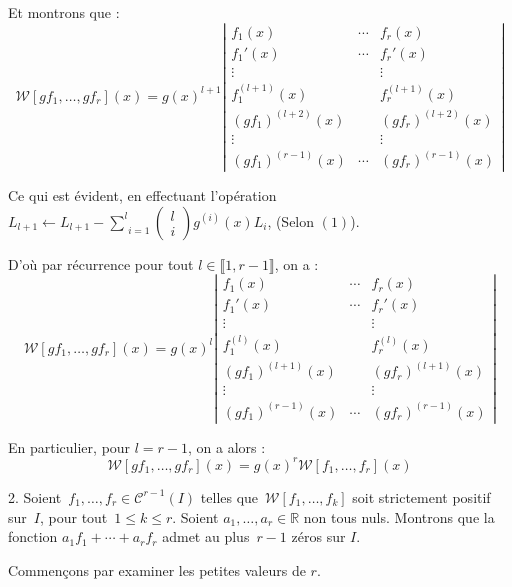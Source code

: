 Et montrons que :
\[ \mathcal{W} [gf_1, \ldots, gf_r] (x) = g (x)^{l + 1} \left|
   \begin{array}{ccc}
     f_1 (x) & \cdots & f_r (x)\\
     f_1' (x) & \cdots & f_r' (x)\\
     \vdots &  & \vdots\\
     f^{(l + 1)}_1 (x) &  & f^{(l + 1)}_r (x)\\
     (g f_1)^{(l + 2)} (x) &  & (g f_r)^{(l + 2)} (x)\\
     \vdots &  & \vdots\\
     (g f_1)^{(r - 1)} (x) & \cdots & (g f_r)^{(r - 1)} (x)
   \end{array} \right| \]

Ce qui est {\'e}vident, en effectuant l'op{\'e}ration $L_{l + 1} \leftarrow L_{l + 1} - \underset{i = 1}{\overset{l}{\sum}} \left( \begin{array}{c} l\\ i \end{array} \right) g^{(i)} (x) L_i$, (Selon $(1)$).

D'o{\`u} par r{\'e}currence pour tout $l \in \llbracket 1, r - 1 \rrbracket$,
on a :
\[ \mathcal{W} [gf_1, \ldots, gf_r] (x) = g (x)^l \left| \begin{array}{ccc}
     f_1 (x) & \cdots & f_r (x)\\
     f_1' (x) & \cdots & f_r' (x)\\
     \vdots &  & \vdots\\
     f^{(l)}_1 (x) &  & f^{(l)}_r (x)\\
     (g f_1)^{(l + 1)} (x) &  & (g f_r)^{(l + 1)} (x)\\
     \vdots &  & \vdots\\
     (g f_1)^{(r - 1)} (x) & \cdots & (g f_r)^{(r - 1)} (x)
   \end{array} \right| \]

En particulier, pour $l = r - 1$, on a alors :
\[ \mathcal{W} [gf_1, \ldots, gf_r] (x) = g (x)^r \mathcal{W} [f_1, \ldots,
   f_r] (x) \]


2. Soient~$f_1, \ldots, f_r \in \mathcal{C}^{r - 1} (I)$ telles
que~$\mathcal{W} [f_1, \ldots, f_k]$ soit strictement positif sur~$I$, pour
tout~$1 \leq k \leq r$. Soient $a_1, \ldots, a_r \in \mathbb{R}$ non tous
nuls. Montrons que la fonction $a_1 f_1 + \cdots + a_r f_r$ admet au plus~$r -
1$ z{\'e}ros sur $I$.

Commen{\c c}ons par examiner les petites valeurs de $r$.

